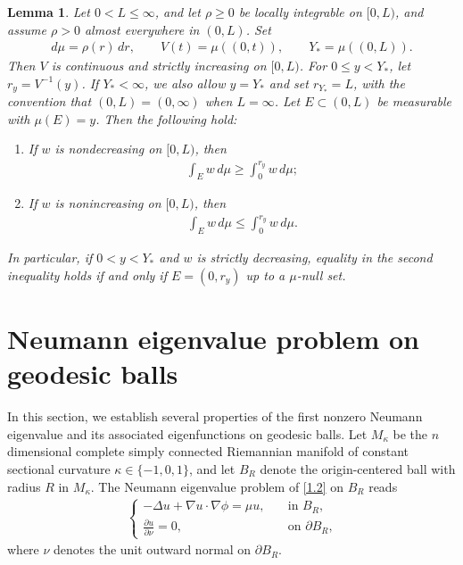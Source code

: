 \documentclass[11pt,leqno]{amsart}
\newtheorem{lemma}{Lemma}[section]
\def\k{\kappa}
\def\p{\partial}
\def\k{\kappa}
\def \p {\partial}
\numberwithin{equation}{section}
\begin{document}
\begin{lemma}\label{lm2.3}
Let $0<L\leq\infty$, and let $\rho\geq0$ be locally integrable on $[0,L)$, and assume $\rho>0$ almost everywhere in $(0,L)$. Set
\begin{align*}
d\mu=\rho(r)\,dr,
\qquad
V(t)=\mu((0,t)),
\qquad
Y_*=\mu((0,L)).
\end{align*}
Then $V$ is continuous and strictly increasing on $[0,L)$. For $0\leq y<Y_*$, let $r_y=V^{-1}(y)$. If $Y_*<\infty$, we also allow $y=Y_*$ and set $r_{Y_*}=L$, with the convention that $(0,L)=(0,\infty)$ when $L=\infty$. Let $E\subset(0,L)$ be measurable with $\mu(E)=y$. Then the following hold:
\begin{enumerate}
\item If $w$ is nondecreasing on $[0,L)$, then
\begin{align*}
\int_E w\,d\mu\geq\int_0^{r_y}w\,d\mu;
\end{align*}
\item If $w$ is nonincreasing on $[0,L)$, then
\begin{align*}
\int_E w\,d\mu\leq\int_0^{r_y}w\,d\mu.
\end{align*}
\end{enumerate}
In particular, if $0<y<Y_*$ and $w$ is strictly decreasing, equality in the second inequality holds if and only if $E=(0,r_y)$ up to a $\mu$-null set.
\end{lemma}





\section{Neumann eigenvalue problem on geodesic balls}\label{sect3}
In this section, we establish several properties of the first nonzero Neumann eigenvalue and its associated eigenfunctions on geodesic balls. Let $M_\k$  be the $n$ dimensional  complete simply connected Riemannian manifold of constant sectional curvature $\kappa\in\{-1,0,1\}$, and let  $B_R$ denote the origin-centered ball with radius $R$ in $M_\k$. The Neumann eigenvalue problem of \eqref{1.2} on $B_R$ reads
\begin{align}\label{3.1}
   \begin{cases}
       -\Delta u+\nabla u \cdot \nabla \phi=\mu u, \quad& \text{in $B_R$,}\\
       \frac{\p u}{\p \nu}=0, \quad& \text{on $\p B_R$,}
   \end{cases} 
\end{align}
where $\nu$ denotes the unit outward normal on  $\p B_R$.
\end{document}
